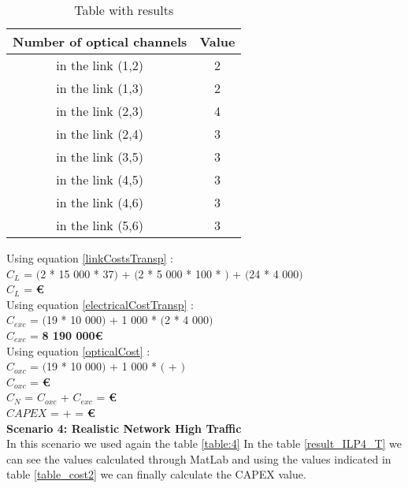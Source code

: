 \begin{table}[h!]
\centering
\begin{tabular}{|| c | c||}
 \hline
 Number of optical channels & Value \\
 \hline\hline
 in the link (1,2) & 2 \\
 in the link (1,3) & 2 \\
 in the link (2,3) & 4 \\
 in the link (2,4) & 3 \\
 in the link (3,5) & 3 \\
 in the link (4,5) & 3 \\
 in the link (4,6) & 3 \\
 in the link (5,6) & 3 \\
 \hline
\end{tabular}
\caption{Table with results}
\label{result_ILP3_T}
\end{table}

Using equation \ref{linkCostsTransp} : \\
$C_L$ = $($2 * 15 000 * 37$)$ + $($2 * 5 000 * 100 * $)$ + $($24 * 4 000$)$ \\
$C_L$ = \textbf{ \euro} \\

Using equation \ref{electricalCostTransp} : \\
$C_{exc}$ = $($19 * 10 000$)$ + 1 000 * $($2 * 4 000$)$ \\
$C_{exc}$ = \textbf{8 190 000\euro} \\

Using equation \ref{opticalCost} : \\
$C_{oxc}$ = $($19 * 10 000$)$ + 1 000 * $($ + $)$ \\
$C_{oxc}$ = \textbf{ \euro} \\
$C_N$ = $C_{oxc}$ + $C_{exc}$ = \textbf{ \euro} \\

$CAPEX$ =  +  = \textbf{ \euro}\\


\vspace{11pt}
\textbf{Scenario 4: Realistic Network High Traffic} \label{Scenario4_transp} \\
In this scenario we used again the table \ref{table:4} In the table \ref{result_ILP4_T} we can see the values calculated through MatLab and using the values indicated in table \ref{table_cost2} we can finally calculate the CAPEX value. \\

